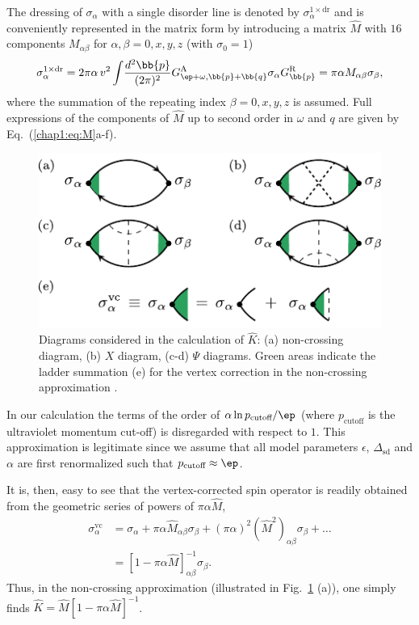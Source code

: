 The dressing of $\sigma_\alpha$ with a single disorder line is denoted by $\sigma_\alpha^{1\times\text{dr}}$ and is conveniently represented in the matrix form by introducing a matrix $\hat{M}$ with $16$ components $M_{\alpha\beta}$ for $\alpha,\beta=0,x,y,z$ (with $\sigma_0=1$)
    \begin{align}
       \sigma_\alpha^{1\times\text{dr}}  = 2\pi \alpha\, v^2 \int\!\frac{d^2\bb{p}}{(2\pi)^2} G^\text{A}_{\ep+\omega,\bb{p}+\bb{q}}\sigma_\alpha G^\text{R}_{\bb{p}} = \pi\alpha M_{\alpha\beta}\sigma_\beta,
        \label{chap1:eq:myseries}
    \end{align}
where the summation of the repeating index $\beta=0,x,y,z$ is assumed. Full expressions of the components of $\hat{M}$ up to second order in $\omega$ and $q$ are given by Eq.~(\ref{chap1:eq:M}a-f). 
\begin{figure}[t]
\centering
\includegraphics[]{articles/dirac_fm/fig2}
\caption{Diagrams considered in the calculation of $\hat{K}$: (a) non-crossing diagram, (b) $X$ diagram, (c-d) $\Psi$ diagrams. Green areas indicate the ladder summation (e) for the vertex correction in the non-crossing approximation \protect\cite{ivan}.}
\label{fig:diagrams}
\end{figure}

In our calculation the terms of the order of $\alpha \ln p_\textrm{cutoff}/\ep$ (where $p_\textrm{cutoff}$ is the ultraviolet momentum cut-off) is disregarded with respect to $1$. This approximation is legitimate since we assume that all model parameters $\epsilon$, $\Delta_\textrm{sd}$ and $\alpha$ are first renormalized such that $p_\textrm{cutoff} \approx \ep$.

It is, then, easy to see that the vertex-corrected spin operator is readily obtained from the geometric series of powers of $\pi\alpha \hat{M}$, 
\begin{align}
\sigma_\alpha^\text{vc} &= 
\sigma_\alpha+\pi\alpha \hat{M}_{\alpha\beta}\sigma_\beta+(\pi\alpha)^2 (\hat{M}^2)_{\alpha\beta}\sigma_\beta+\dots\nonumber\\
&=\left[1-\pi\alpha \hat{M}\right]^{-1}_{\alpha\beta}\sigma_\beta.
\end{align}
Thus, in the non-crossing approximation (illustrated in Fig.~\ref{fig:diagrams} (a)), one simply finds $\hat{K}= \hat{M}[1-\pi\alpha \hat{M}]^{-1}$. 